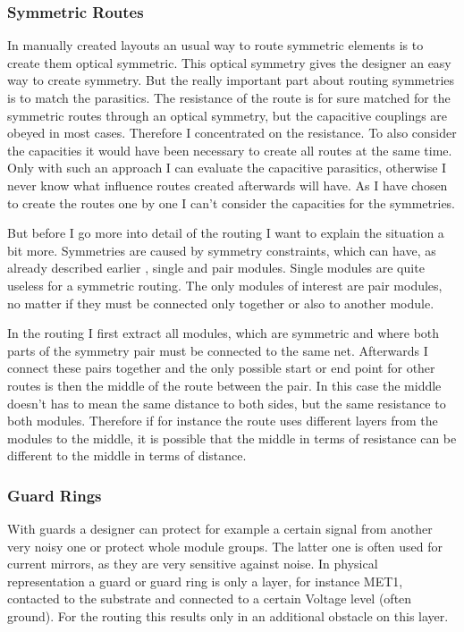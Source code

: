 \subsubsection{Symmetric Routes}
In manually created layouts an usual way to route symmetric elements is to create them optical symmetric. This optical symmetry gives the designer an easy way to create symmetry. But the really important part about routing symmetries is to match the parasitics. The resistance of the route is for sure matched for the symmetric routes through an optical symmetry, but the capacitive couplings are obeyed in most cases. Therefore I concentrated on the resistance. To also consider the capacities it would have been necessary to create all routes at the same time. Only with such an approach I can evaluate the capacitive parasitics, otherwise I never know what influence routes created afterwards will have. As I have chosen to create the routes one by one I can't consider the capacities for the symmetries.

But before I go more into detail of the routing I want to explain the situation a bit more. Symmetries are caused by symmetry constraints, which can have, as already described earlier , single and pair modules. Single modules are quite useless for a symmetric routing. The only modules of interest are pair modules, no matter if they must be connected only together or also to another module.

In the routing I first extract all modules, which are symmetric and where both parts of the symmetry pair must be connected to the same net. Afterwards I connect these pairs together and the only possible start or end point for other routes is then the middle of the route between the pair. In this case the middle doesn't has to mean the same distance to both sides, but the same resistance to both modules. Therefore if for instance the route uses different layers from the modules to the middle, it is possible that the middle in terms of resistance can be different to the middle in terms of distance.

\subsubsection{Guard Rings}
With guards  a designer can protect for example a certain signal from another very noisy one or protect whole module groups. The latter one is often used for current mirrors, as they are very sensitive against noise. In physical representation a guard or guard ring is only a layer, for instance MET1, contacted to the substrate and connected to a certain Voltage level (often ground). For the routing this results only in an additional obstacle on this layer.

